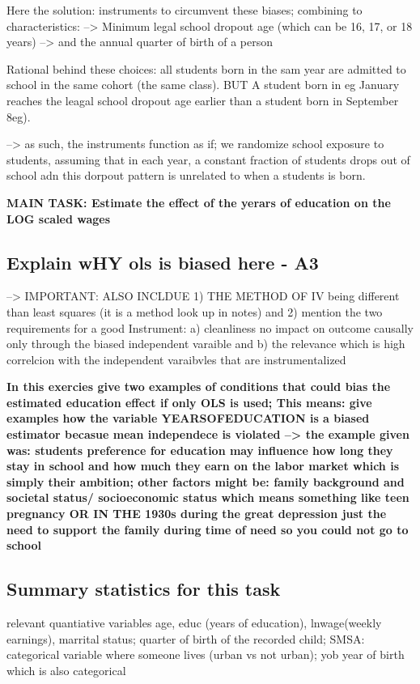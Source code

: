 \documentclass[a4paper]{article}
\begin{document}
Here the solution: instruments to circumvent these biases; combining to characteristics: 
--> Minimum legal school dropout age (which can be 16, 17, or 18 years) 
--> and the annual quarter of birth of a person

Rational behind these choices: all students born in the sam year are admitted to school in the same cohort (the same class). BUT A student born in eg January reaches the leagal school dropout age earlier than a student born in September 8eg).

--> as such, the instruments function as if; we randomize school exposure to students, assuming that in each year, a constant fraction of students drops out of school adn this dorpout pattern is unrelated to when a students is born. 

\textbf{MAIN TASK: Estimate the effect of the yerars of education on the LOG scaled wages}

\subsection{Explain wHY ols is biased here - A3}
--> IMPORTANT: ALSO INCLDUE 1) THE METHOD OF IV being different than least squares (it is a method look up in notes) and 2) mention the two requirements for a good Instrument: a) cleanliness no impact on outcome causally only through the biased independent varaible and b) the relevance which is high correlcion with the independent varaibvles that are instrumentalized

\textbf{In this exercies give two examples of conditions that could bias the estimated education effect if only OLS is used; This means: give examples how the variable YEARSOFEDUCATION is a biased estimator becasue mean independece is violated --> the example given was: students preference for education may influence how long they stay in school and how much they earn on the labor market which is simply their ambition; other factors might be: family background and societal status/ socioeconomic status which means something like teen pregnancy OR IN THE 1930s during the great depression just the need to support the family during time of need so you could not go to school}


\subsection{Summary statistics for this task}

relevant quantiative variables age, educ (years of education), lnwage(weekly earnings), marrital status; quarter of birth of the recorded child; SMSA: categorical variable where someone lives (urban vs not urban); yob year of birth which is also categorical
\end{document}
